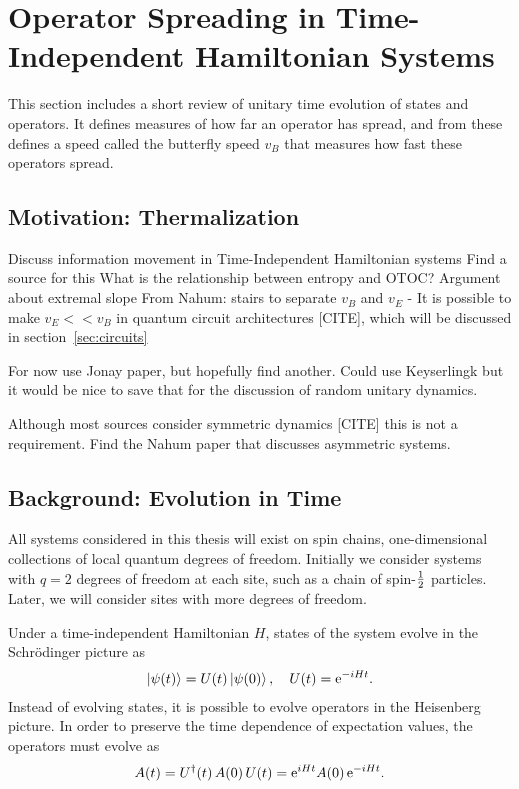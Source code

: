 \section{Operator Spreading in Time-Independent Hamiltonian Systems} \label{sec:opsp}

This section includes a short review of unitary time evolution of states and operators. It defines measures of how far an operator has spread, and from these defines a speed called the butterfly speed $v_B$ that measures how fast these operators spread.

\subsection{Motivation: Thermalization} \label{sub:therm}

Discuss information movement in Time-Independent Hamiltonian systems
  Find a source for this
  What is the relationship between entropy and OTOC?
  Argument about extremal slope
    From Nahum: stairs to separate $v_B$ and $v_E$ - It is possible to make $v_E << v_B$ in quantum circuit architectures [CITE], which will be discussed in section~\ref{sec:circuits}
    
For now use Jonay paper, but hopefully find another. Could use Keyserlingk but it would be nice to save that for the discussion of random unitary dynamics.

Although most sources consider symmetric dynamics [CITE] this is not a requirement. Find the Nahum paper that discusses asymmetric systems.

\subsection{Background: Evolution in Time} \label{sub:evoltime}

All systems considered in this thesis will exist on spin chains, one-dimensional collections of  local quantum degrees of freedom. Initially we consider systems with $q=2$ degrees of freedom at each site, such as a chain of spin-$\frac{1}{2}$ particles. Later, we will consider sites with more degrees of freedom. 

Under a time-independent Hamiltonian $H$, states of the system evolve in the Schr\"odinger picture as 
\begin{align}
\left|\psi(t)\right\rangle = U(t)\left|\psi(0)\right\rangle,\quad U(t) = \text{e}^{-iHt}. \label{eqn:shro}
\end{align}
Instead of evolving states, it is possible to evolve operators in the Heisenberg picture. In order to preserve the time dependence of expectation values, the operators must evolve as 
\begin{align}
A(t) = U^\dag(t)\,A(0)\,U(t) = \text{e}^{iHt}A(0)\,\text{e}^{-iHt}.\label{eqn:heis}
\end{align}

